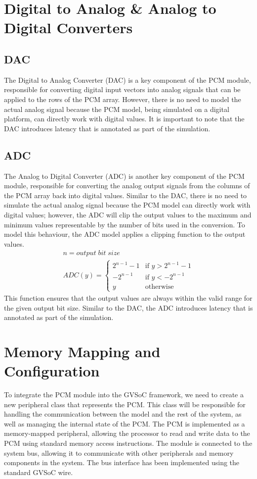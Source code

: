\section{Digital to Analog \& Analog to Digital Converters}\label{sec:mod_gvsoc}
\subsection{DAC}\label{sec:dac}
The Digital to Analog Converter (DAC) is a key component of the PCM module, responsible for converting digital input vectors into analog signals that can be applied to the rows of the PCM array.
However, there is no need to model the actual analog signal because the PCM model, being simulated on a digital platform, can directly work with digital values.
It is important to note that the DAC introduces latency that is annotated as part of the simulation.

\subsection{ADC}\label{sec:adc}
The Analog to Digital Converter (ADC) is another key component of the PCM module, responsible for converting the analog output signals from the columns of the PCM array back into digital values.
Similar to the DAC, there is no need to simulate the actual analog signal because the PCM model can directly work with digital values; however, the ADC will clip the output values to the maximum and minimum values representable by the number of bits used in the conversion.
To model this behaviour, the ADC model applies a  clipping function to the output values.
\begin{align*}     
    n=output\;bit\;size\\
    ADC(y) = 
    \begin{cases}
    2^{n-1}-1 & \text{if } y > 2^{n-1}-1 \\
    -2^{n-1} & \text{if } y < -2^{n-1} \\
    y & \text{otherwise}
    \end{cases}
\end{align*}
This function ensures that the output values are always within the valid range for the given output bit size.
Similar to the DAC, the ADC introduces latency that is annotated as part of the simulation.

\section{Memory Mapping and Configuration}\label{sec:gvsoc_int}
To integrate the PCM module into the GVSoC framework, we need to create a new peripheral class that represents the PCM.
This class will be responsible for handling the communication between the model and the rest of the system,
as well as managing the internal state of the PCM.
The PCM is implemented as a memory-mapped peripheral, allowing the processor to read and write data to the PCM using standard memory access instructions.
The module is connected to the system bus, allowing it to communicate with other peripherals and memory components in the system.
The bus interface has been implemented using the standard GVSoC wire.

